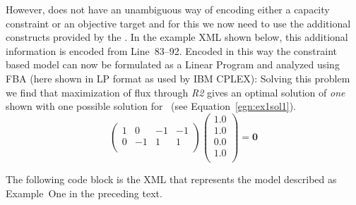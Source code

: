 %
However, \sbmlthreecore does not have an unambiguous way of encoding either
a capacity constraint or an objective target and for this we now need to use
the additional constructs provided by the \FBCPackage. In the example XML
shown below, this additional information is encoded from Line~83--92.
Encoded in this way the constraint based model can now be formulated as a
Linear Program and analyzed using FBA (here shown in LP format as used by
IBM CPLEX):
%
%
Solving this problem we find that maximization of flux through \textit{R2}
gives an optimal solution of \textit{one} shown with one possible solution
for \Jvec\ (see Equation~\ref{egn:ex1sol1}).
\begin{equation}\label{egn:ex1sol1}
  \left(
    \begin{array}{cccc}
        1 &  0 & -1 & -1 \\
        0 & -1 &  1 &  1 \\
    \end{array}
  \right)
  \left(
    \begin{array}{c}
        1.0 \\
        1.0 \\
        0.0 \\
        1.0 \\
    \end{array}
  \right)
  = \textbf{0}
\end{equation}

The following code block is the XML that represents the model described as
Example~One in the preceding text.
%
